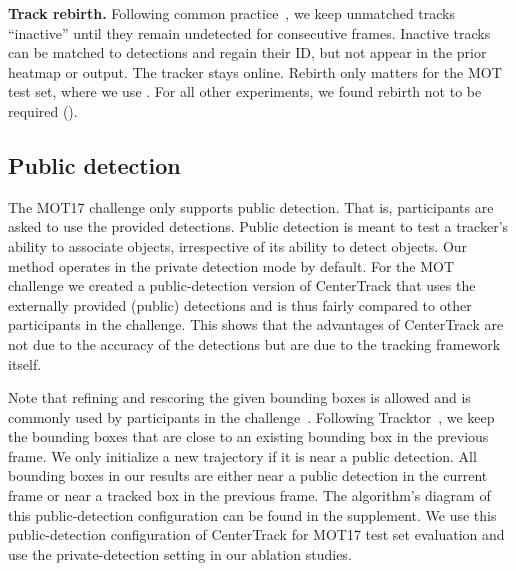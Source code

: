 \documentclass[runningheads]{llncs}
\newcommand{\lblsec}[1]{\label{sec:#1}}
\renewcommand{\paragraph}[1]{\noindent\textbf{#1}}
\begin{document}
\paragraph{Track rebirth.}
\lblsec{rebirth}
Following common practice~\cite{zhang2018integrated,bergmann2019tracking},
we keep unmatched tracks ``inactive'' until they remain undetected for  consecutive frames. 
Inactive tracks can be matched to detections and regain their ID, but not appear in the prior heatmap or output. 
The tracker stays online.
Rebirth only matters for the MOT test set, where we use .
For all other experiments, we found rebirth not to be required ().

\subsection{Public detection}
\lblsec{public}

The MOT17 challenge only supports public detection.
That is, participants are asked to use the provided detections.
Public detection is meant to test a tracker's ability to associate objects, irrespective of its ability to detect objects.
Our method operates in the private detection mode by default.
For the MOT challenge we created a public-detection version of CenterTrack that uses the externally provided (public) detections and is thus fairly compared to other participants in the challenge. This shows that the advantages of CenterTrack are not due to the accuracy of the detections but are due to the tracking framework itself.

Note that refining and rescoring the given bounding boxes is allowed and is commonly used by participants in the challenge~\cite{bergmann2019tracking,long2018tracking,keuper2018motion}.
Following Tracktor~\cite{bergmann2019tracking}, we keep the bounding boxes that are close to an existing bounding box in the previous frame.
We only initialize a new trajectory if it is near a public detection.
All bounding boxes in our results are either near a public detection in the current frame or near a tracked box in the previous frame.
The algorithm's diagram of this public-detection configuration can be found in the supplement.
We use this public-detection configuration of CenterTrack for MOT17 test set evaluation and use the private-detection setting in our ablation studies.
\end{document}
